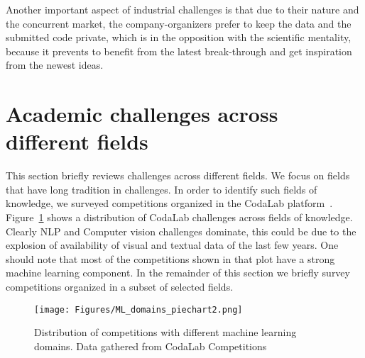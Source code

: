 \documentclass[twoside,11pt]{article}
\begin{document}
Another important aspect of industrial challenges is that due to their nature and the concurrent market, the company-organizers prefer to keep the data and the submitted code private, which is in the opposition with the scientific mentality, because it prevents to benefit from the latest break-through and get inspiration from the newest ideas.




\section{Academic challenges across different fields}
\label{sec:perdiscipline:Chapter6}
This section briefly reviews challenges across different fields. We focus on fields that have long tradition in challenges. In order to identify such fields of knowledge, we surveyed competitions organized in the CodaLab platform~\citep{codalab_competitions_JMLR}. Figure~\ref{fig:pie_chart} shows a distribution of CodaLab challenges across fields of knowledge. Clearly NLP and Computer vision challenges dominate, this could be due to the explosion of availability of visual and textual data of the last few years. One should note that most of the competitions shown in that plot have a strong machine learning component. In the remainder of this section we briefly survey competitions organized in a subset of selected fields. 

\begin{figure}[h]
    \centering
    \texttt{[image: Figures/ML\_domains\_piechart2.png]}
    \caption{Distribution of competitions with different machine learning domains. Data gathered from CodaLab Competitions~\citep{codalab_competitions_JMLR}}
    \label{fig:pie_chart}
\end{figure}

\end{document}

